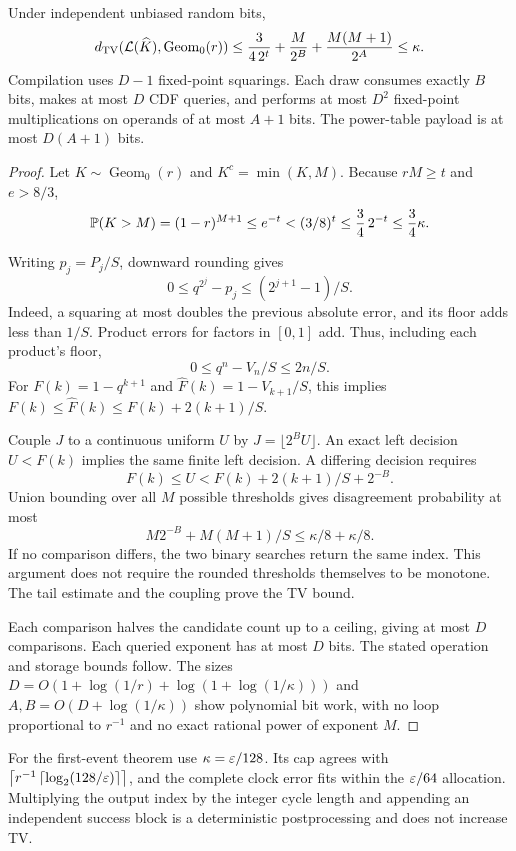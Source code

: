 \begin{lemma}
Under independent unbiased random bits,
\[
d_{\mathrm{TV}}(\mathcal L(\widehat K),\operatorname{Geom}_0(r))
\le
\frac{3}{4\,2^t}+\frac{M}{2^B}+\frac{M(M+1)}{2^A}
\le\kappa .
\]
Compilation uses $D-1$ fixed-point squarings. Each draw consumes exactly
$B$ bits, makes at most $D$ CDF queries, and performs at most $D^2$
fixed-point multiplications on operands of at most $A+1$ bits. The
power-table payload is at most $D(A+1)$ bits.
\end{lemma}
\begin{proof}
Let $K\sim\operatorname{Geom}_0(r)$ and $K^c=\min(K,M)$. Because $rM\ge t$
and $e>8/3$,
\[
\mathbb P(K>M)=(1-r)^{M+1}
\le e^{-t}<(3/8)^t\le \frac34\,2^{-t}\le\frac34\kappa.
\]

Writing $p_j=P_j/S$, downward rounding gives
\[
0\le q^{2^j}-p_j\le(2^{j+1}-1)/S.
\]
Indeed, a squaring at most doubles the previous absolute error, and its
floor adds less than $1/S$. Product errors for factors in $[0,1]$ add.
Thus, including each product's floor,
\[
0\le q^n-V_n/S\le2n/S.
\]
For $F(k)=1-q^{k+1}$ and $\widehat F(k)=1-V_{k+1}/S$, this implies
$F(k)\le\widehat F(k)\le F(k)+2(k+1)/S$.

Couple $J$ to a continuous uniform $U$ by $J=\lfloor2^BU\rfloor$.
An exact left decision $U<F(k)$ implies the same finite left decision.
A differing decision requires
\[
F(k)\le U<F(k)+2(k+1)/S+2^{-B}.
\]
Union bounding over all $M$ possible thresholds gives disagreement
probability at most
\[
M2^{-B}+M(M+1)/S\le\kappa/8+\kappa/8.
\]
If no comparison differs, the two binary searches return the same
index. This argument does not require the rounded thresholds themselves
to be monotone. The tail estimate and the coupling prove the TV bound.

Each comparison halves the candidate count up to a ceiling, giving
at most $D$ comparisons. Each queried exponent has at most $D$ bits.
The stated operation and storage bounds follow. The sizes
$D=O(1+\log(1/r)+\log(1+\log(1/\kappa)))$ and
$A,B=O(D+\log(1/\kappa))$ show polynomial bit work, with no loop
proportional to $r^{-1}$ and no exact rational power of exponent $M$.
\end{proof}

For the first-event theorem use $\kappa=\varepsilon/128$. Its cap agrees with
$\left\lceil r^{-1}\left\lceil\log_2(128/\varepsilon)\right\rceil\right\rceil$, and the complete clock error fits
within the $\varepsilon/64$ allocation. Multiplying the output index by the
integer cycle length and appending an independent success block is a
deterministic postprocessing and does not increase TV.

